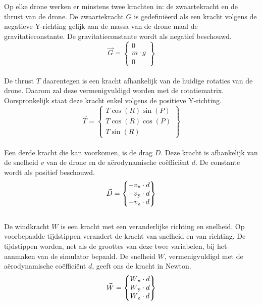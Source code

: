 \\
\\
Op elke drone werken er minstens twee krachten in: de zwaartekracht en de thrust van de drone. De zwaartekracht \(G\) is gedefiniëerd als een kracht volgens de negatieve Y-richting gelijk aan de massa van de drone maal de gravitatieconstante. De gravitatieconstante wordt als negatief beschouwd.
\begin{equation*}
\vec{G} = 
\begin{Bmatrix}
0 \\
m \cdot g \\
0
\end{Bmatrix} \label{zwaartekracht}
\end{equation*}
\\
De thrust \(T\) daarentegen is een kracht afhankelijk van de huidige rotaties van de drone. Daarom zal deze vermenigvuldigd worden met de rotatiematrix. Oorspronkelijk staat deze kracht enkel volgens de positieve Y-richting. 
\\
\begin{equation*}
\vec{T} =
\begin{Bmatrix}
T \cos(R) \sin(P) \\
T \cos(R)\cos(P)\\
T \sin(R)
\end{Bmatrix} \label{thrustkracht}
\end{equation*}
\\
Een derde kracht die kan voorkomen, is de drag \(D\). Deze kracht is afhankelijk van de snelheid \(v\) van de drone en de a\"erodynamische coëfficiënt \(d\). De constante wordt als positief beschouwd.
\begin{equation*}
\vec{D} =
\begin{Bmatrix}
-v\textsubscript{x} \cdot d \\
-v\textsubscript{y} \cdot d \\
-v\textsubscript{z} \cdot d 
\end{Bmatrix} \label{dragkracht}
\end{equation*}
\\
De windkracht \(W\) is een kracht met een veranderlijke richting en snelheid. Op voorbepaalde tijdstippen verandert de kracht van snelheid en van richting. De tijdstippen worden, net als de groottes van deze twee variabelen, bij het aanmaken van de simulator bepaald. De snelheid \(W\), vermenigvuldigd met de a\"erodynamische coëfficiënt \(d\), geeft ons de kracht in Newton. 
\begin{equation*}
\vec{W} = 
\begin{Bmatrix}
W\textsubscript{x} \cdot d \\
W\textsubscript{y} \cdot d \\
W\textsubscript{z} \cdot d 
\end{Bmatrix} \label{windkracht}
\end{equation*}
